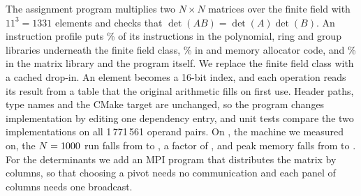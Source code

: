 The assignment program multiplies two $N \times N$ matrices over the finite field with
$11^3 = 1331$ elements and checks that $\det(AB) = \det(A)\det(B)$. An instruction profile
puts \ProfileLibraries\% of its instructions in the polynomial, ring and group libraries
underneath the finite field class, \ProfileMemory\% in  and memory
allocator code, and \ProfileProgram\% in the matrix library and the program itself. We replace the finite field class with a cached drop-in. An element becomes a 16-bit
index, and each operation reads its result from a table that the original arithmetic fills
on first use.
Header paths, type names and the CMake target are unchanged, so the program changes
implementation by editing one dependency entry, and unit tests compare the two implementations
on all 1\,771\,561 operand pairs. On \SequentialMachine, the machine we measured on, the
$N=1000$ run falls from
\SeqOriginalAtLargest{} to \SeqCachedAtLargest{}, a factor of \SeqSpeedupAtLargest, and peak
memory falls from \SeqOriginalMemoryAtLargest{} to \SeqCachedMemoryAtLargest. For the
determinants we add an MPI program that distributes the matrix by columns, so that choosing a
pivot needs no communication and each panel of columns needs one broadcast.
\MpiAbstractSentence
